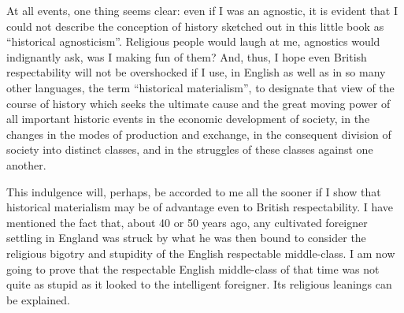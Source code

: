 At all events, one thing seems clear: even if I was an agnostic, it is evident
that I could not describe the conception of history sketched out in this little
book as ``historical agnosticism''. Religious people would laugh at me,
agnostics would indignantly ask, was I making fun of them? And, thus, I hope
even British respectability will not be overshocked if I use, in English as
well as in so many other languages, the term ``historical materialism'', to
designate that view of the course of history which seeks the ultimate cause and
the great moving power of all important historic events in the economic
development of society, in the changes in the modes of production and exchange,
in the consequent division of society into distinct classes, and in the
struggles of these classes against one another.

This indulgence will, perhaps, be accorded to me all the sooner if I show that
historical materialism may be of advantage even to British respectability. I
have mentioned the fact that, about 40 or 50 years ago, any cultivated
foreigner settling in England was struck by what he was then bound to consider
the religious bigotry and stupidity of the English respectable middle-class. I
am now going to prove that the respectable English middle-class of that time
was not quite as stupid as it looked to the intelligent foreigner. Its
religious leanings can be explained.

\printendnotes
